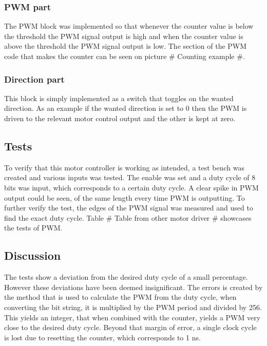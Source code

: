 \subsubsection{PWM part}

The PWM block was implemented so that whenever the counter value is below the threshold the PWM signal output is high and when the counter value is above the threshold the PWM signal output is low. The section of the PWM code that makes the counter can be seen on picture \# Counting example \#.


\subsubsection{Direction part}

This block is simply implemented as a switch that toggles on the wanted direction. As an example if the wanted direction is set to 0 then the PWM is driven to the relevant motor control output and the other is kept at zero.

\subsection{Tests}

To verify that this motor controller is working as intended, a test bench was created and various inputs was tested. The enable was set and a duty cycle of 8 bits was input, which corresponds to a certain duty cycle. A clear spike in PWM output could be seen, of the same length every time PWM is outputting.
To further verify the test, the edges of the PWM signal was measured and used to find the exact duty cycle. Table \# Table from other motor driver \# showcases the tests of PWM.

\subsection{Discussion}

The tests show a deviation from the desired duty cycle of a small percentage. However these deviations have been deemed insignificant. The errors is created by the method that is used to calculate the PWM from the duty cycle, when converting the bit string, it is multiplied by the PWM period and divided by 256. This yields an integer, that when combined with the counter, yields a PWM very close to the desired duty cycle. Beyond that margin of error, a single clock cycle is lost due to resetting the counter, which corresponds to 1 ns.


